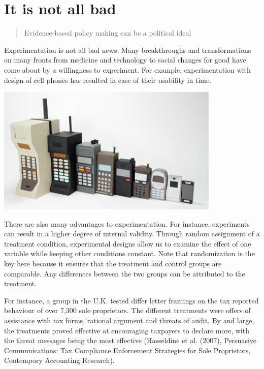 \documentclass[openany]{book}
\begin{document}
\hypertarget{it-is-not-all-bad}{%
\section{It is not all bad}\label{it-is-not-all-bad}}

\begin{quote}
Evidence-based policy making can be a political ideal
\end{quote}

Experimentation is not all bad news. Many breakthroughs and transformations on many fronts from medicine and technology to social changes for good have come about by a willingness to experiment. For example, experimentation with design of cell phones has resulted in ease of their usability in time.

\includegraphics[width=0.8\textwidth,height=\textheight]{fig/cellphone_evolution.png}

There are also many advantages to experimentation. For instance, experiments can result in a higher degree of internal validity. Through random assignment of a treatment condition, experimental designs allow us to examine the effect of one variable while keeping other conditions constant. Note that randomization is the key here because it ensures that the treatment and control groups are comparable. Any differences between the two groups can be attributed to the treatment.

For instance, a group in the U.K. tested differ letter framings on the tax reported behaviour of over 7,300 sole proprietors. The different treatments were offers of assistance with tax forms, rational argument and threats of audit. By and large, the treatments proved effective at encouraging taxpayers to declare more, with the threat messages being the most effective (Hasseldine et al. (2007), Persuasive Communications: Tax Compliance Enforcement Strategies for Sole Proprietors, Contempory Accounting Research).
\end{document}
